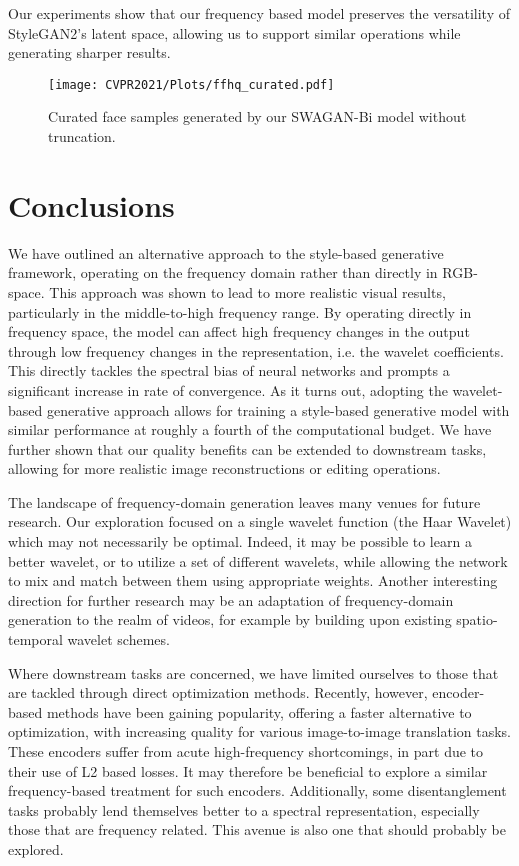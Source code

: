 \documentclass[final]{CVPR2021/cvpr}
\begin{document}
Our experiments show that our frequency based model preserves the versatility of StyleGAN2's latent space, allowing us to support similar operations while generating sharper results.

\begin{figure*}[t]
\begin{center}
\texttt{[image: CVPR2021/Plots/ffhq\_curated.pdf]}
\end{center}
   \caption{Curated face samples generated by our SWAGAN-Bi model without truncation.}
\label{fig:curated_gen_1024}
\end{figure*}
 
\section{Conclusions}
\label{sec:future}

We have outlined an alternative approach to the style-based generative framework, operating on the frequency domain rather than directly in RGB-space. This approach was shown to lead to more realistic visual results, particularly in the middle-to-high frequency range. By operating directly in frequency space, the model can affect high frequency changes in the output through low frequency changes in the representation, i.e. the wavelet coefficients. This  directly tackles the spectral bias of neural networks and prompts a significant increase in rate of convergence. As it turns out, adopting the wavelet-based generative approach allows for training a style-based generative model with similar performance at roughly a fourth of the computational budget.
We have further shown that our quality benefits can be extended to downstream tasks, allowing for more realistic image reconstructions or editing operations. 

The landscape of frequency-domain generation leaves many venues for future research. Our exploration focused on a single wavelet function (the Haar Wavelet) which may not necessarily be optimal. Indeed, it may be possible to learn a better wavelet, or to utilize a set of different wavelets, while allowing the network to mix and match between them using appropriate weights.
Another \mbox{interesting} direction for further research may be an adaptation of frequency-domain generation to the realm of videos, for example by building upon existing spatio-temporal wavelet schemes.

Where downstream tasks are concerned, we have limited ourselves to those that are tackled through direct optimization methods. Recently, however, encoder-based methods \cite{richardson2020encoding} have been gaining popularity, 
offering a faster alternative to optimization, with increasing quality for various image-to-image translation tasks. 
These encoders suffer from acute high-frequency shortcomings, in part due to their use of L2 based losses. It may therefore be beneficial to explore a similar frequency-based treatment for such encoders. Additionally, some disentanglement tasks probably lend themselves better to a spectral representation, especially those that are frequency related. This avenue is also one that should probably be explored.
\end{document}
